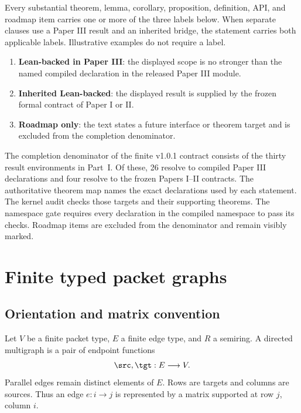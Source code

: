 Every substantial theorem, lemma, corollary, proposition, definition, API,
and roadmap item carries one or more of the three labels below. When separate
clauses use a Paper III result and an inherited bridge, the statement carries
both applicable labels. Illustrative examples do not require a label.
\begin{enumerate}[label=\textbf{S\arabic*.},leftmargin=3.2em]
\item \textbf{Lean-backed in Paper III}: the displayed scope is no stronger
than the named compiled declaration in the released Paper III module.
\item \textbf{Inherited Lean-backed}: the displayed result is supplied by the
frozen formal contract of Paper I or II.
\item \textbf{Roadmap only}: the text states a future interface or theorem
target and is excluded from the completion denominator.
\end{enumerate}

\begin{boundary}
The completion denominator of the finite v1.0.1 contract consists of the
thirty result environments in Part~I. Of these, 26 resolve to compiled
Paper III declarations and four resolve to the frozen Papers I--II
contracts. The authoritative theorem map names the exact declarations used
by each statement. The kernel audit checks those targets and their supporting
theorems. The namespace gate requires every declaration in the compiled
 namespace to pass its checks. Roadmap items are
excluded from the denominator and remain visibly marked.
\end{boundary}

\section{Finite typed packet graphs}
\label{sec:edge-operators}

\subsection{Orientation and matrix convention}

Let $V$ be a finite packet type, $E$ a finite edge type, and $R$ a semiring.
A directed multigraph is a pair of endpoint functions
\[
  \src,\tgt:E\longrightarrow V.
\]
Parallel edges remain distinct elements of $E$.  Rows are targets and columns
are sources.  Thus an edge $e:i\to j$ is represented by a matrix supported at
row $j$, column $i$.

